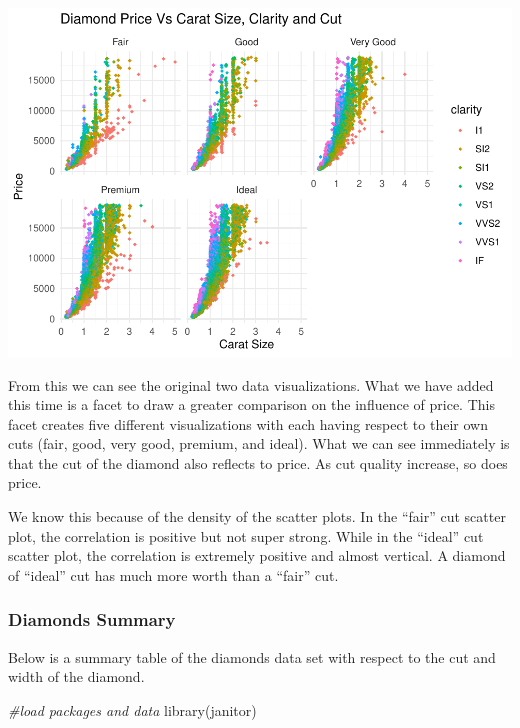 \documentclass[
]{article}
\newenvironment{Shaded}{\begin{snugshade}}{\end{snugshade}}
\newcommand{\CommentTok}[1]{\textcolor[rgb]{0.56,0.35,0.01}{\textit{#1}}}
\newcommand{\FunctionTok}[1]{\textcolor[rgb]{0.00,0.00,0.00}{#1}}
\newcommand{\NormalTok}[1]{#1}
\begin{document}
\includegraphics{Activity-8-_files/figure-latex/Diamonds - Price vs Carat size, Clarity, and Cut-1.pdf}

From this we can see the original two data visualizations. What we have
added this time is a facet to draw a greater comparison on the influence
of price. This facet creates five different visualizations with each
having respect to their own cuts (fair, good, very good, premium, and
ideal). What we can see immediately is that the cut of the diamond also
reflects to price. As cut quality increase, so does price.

We know this because of the density of the scatter plots. In the
``fair'' cut scatter plot, the correlation is positive but not super
strong. While in the ``ideal'' cut scatter plot, the correlation is
extremely positive and almost vertical. A diamond of ``ideal'' cut has
much more worth than a ``fair'' cut.

\hypertarget{diamonds-summary}{%
\subsubsection{Diamonds Summary}\label{diamonds-summary}}

Below is a summary table of the diamonds data set with respect to the
cut and width of the diamond.

\begin{Shaded}
\begin{Highlighting}[]
\CommentTok{\#load packages and data}
\FunctionTok{library}\NormalTok{(janitor)}
\end{Highlighting}
\end{Shaded}
\end{document}
